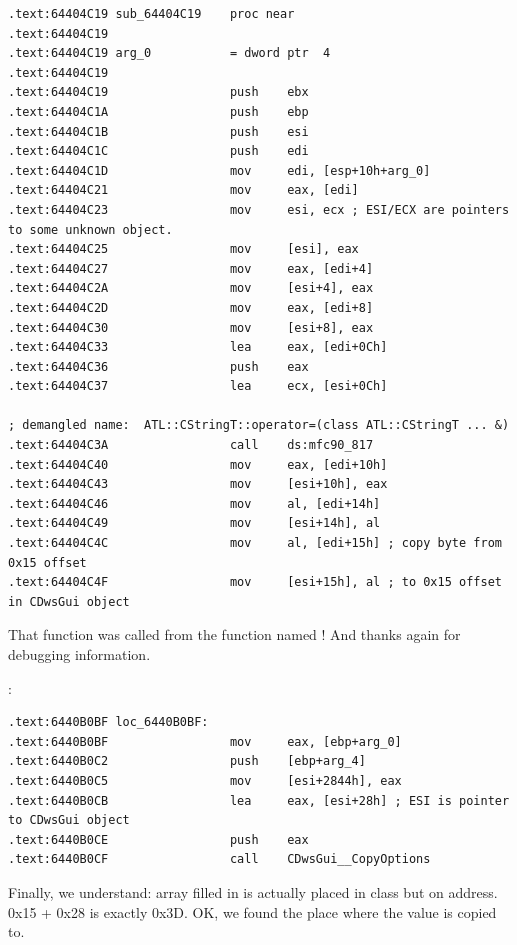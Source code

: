 \begin{lstlisting}
.text:64404C19 sub_64404C19    proc near
.text:64404C19
.text:64404C19 arg_0           = dword ptr  4
.text:64404C19
.text:64404C19                 push    ebx
.text:64404C1A                 push    ebp
.text:64404C1B                 push    esi
.text:64404C1C                 push    edi
.text:64404C1D                 mov     edi, [esp+10h+arg_0]
.text:64404C21                 mov     eax, [edi]
.text:64404C23                 mov     esi, ecx ; ESI/ECX are pointers to some unknown object.
.text:64404C25                 mov     [esi], eax
.text:64404C27                 mov     eax, [edi+4]
.text:64404C2A                 mov     [esi+4], eax
.text:64404C2D                 mov     eax, [edi+8]
.text:64404C30                 mov     [esi+8], eax
.text:64404C33                 lea     eax, [edi+0Ch]
.text:64404C36                 push    eax
.text:64404C37                 lea     ecx, [esi+0Ch]

; demangled name:  ATL::CStringT::operator=(class ATL::CStringT ... &)
.text:64404C3A                 call    ds:mfc90_817 
.text:64404C40                 mov     eax, [edi+10h]
.text:64404C43                 mov     [esi+10h], eax
.text:64404C46                 mov     al, [edi+14h]
.text:64404C49                 mov     [esi+14h], al
.text:64404C4C                 mov     al, [edi+15h] ; copy byte from 0x15 offset
.text:64404C4F                 mov     [esi+15h], al ; to 0x15 offset in CDwsGui object
\end{lstlisting}

{That function was called from the function named ! And thanks again for debugging information.}

 :

\begin{lstlisting}
.text:6440B0BF loc_6440B0BF:
.text:6440B0BF                 mov     eax, [ebp+arg_0]
.text:6440B0C2                 push    [ebp+arg_4]
.text:6440B0C5                 mov     [esi+2844h], eax
.text:6440B0CB                 lea     eax, [esi+28h] ; ESI is pointer to CDwsGui object
.text:6440B0CE                 push    eax
.text:6440B0CF                 call    CDwsGui__CopyOptions
\end{lstlisting}

{Finally, we understand: array filled in  is actually placed in  class 
but on  address. 0x15 + 0x28 is exactly 0x3D. OK, we found the place where the value is copied to.}

